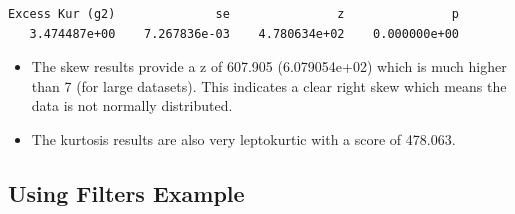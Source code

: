 \documentclass[
  letterpaper,
  DIV=11,
  numbers=noendperiod]{scrreprt}
\providecommand{\tightlist}{%
  \setlength{\itemsep}{0pt}\setlength{\parskip}{0pt}}\usepackage{longtable,booktabs,array}
\begin{document}
\begin{verbatim}
Excess Kur (g2)              se               z               p 
   3.474487e+00    7.267836e-03    4.780634e+02    0.000000e+00 
\end{verbatim}

\begin{itemize}
\tightlist
\item
  The skew results provide a z of 607.905 (6.079054e+02) which is much
  higher than 7 (for large datasets). This indicates a clear right skew
  which means the data is not normally distributed.
\item
  The kurtosis results are also very leptokurtic with a score of
  478.063.
\end{itemize}

\subsection{Using Filters Example}\label{using-filters-example}
\end{document}
